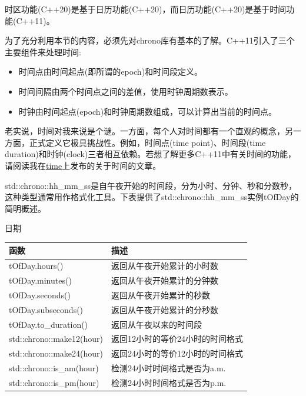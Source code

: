 时区功能(C++20)是基于日历功能(C++20)，而日历功能(C++20)是基于时间功能(C++11)。


\begin{tcolorbox}[breakable,enhanced jigsaw,colback=blue!5!white,colframe=blue!75!black,title={C++11的时间库}]
	
为了充分利用本节的内容，必须先对chrono库有基本的了解。C++11引入了三个主要组件来处理时间:

\begin{itemize}
\item 
时间点由时间起点(即所谓的epoch)和时间段定义。

\item 
时间间隔由两个时间点之间的差值，使用时钟周期数表示。

\item 
时钟由时间起点(epoch)和时钟周期数组成，可以计算出当前的时间点。
\end{itemize}

老实说，时间对我来说是个谜。一方面，每个人对时间都有一个直观的概念，另一方面，正式定义它极具挑战性。例如，时间点(time point)、时间段(time duration)和时钟(clock)三者相互依赖。若想了解更多C++11中有关时间的功能，请阅读我在\href{https://www.modernescpp.com/index.php/tag/time}{time}上发布的关于时间的文章。
	
\end{tcolorbox}


std::chrono::hh\_mm\_ss是自午夜开始的时间段，分为小时、分钟、秒和分数秒，这种类型通常用作格式化工具。下表提供了std::chrono::hh\_mm\_ss实例tOfDay的简明概述。

\begin{center}
日期
\end{center}

\begin{table}[H]
\centering
\begin{tabular}{ll}
\textbf{函数}         & \textbf{描述}                        \\ \hline
tOfDay.hours()            & 返回从午夜开始累计的小时数   \\
tOfDay.minutes()          & 返回从午夜开始累计的分钟数 \\
tOfDay.seconds()          & 返回从午夜开始累计的秒数 \\
tOfDay.subseconds()       & 返回从午夜开始累计的分秒数  \\
tOfDay.to\_duration()     & 返回从午夜以来的时间段    \\
std::chrono::make12(hour) & 返回12小时的等价24小时的时间格式 \\
std::chrono::make24(hour) & 返回24小时的等价12小时的时间格式 \\
std::chrono::is\_am(hour) & 检测24小时时间格式是否为a.m.  \\
std::chrono::is\_pm(hour) & 检测24小时时间格式是否为p.m.
\end{tabular}
\end{table}

